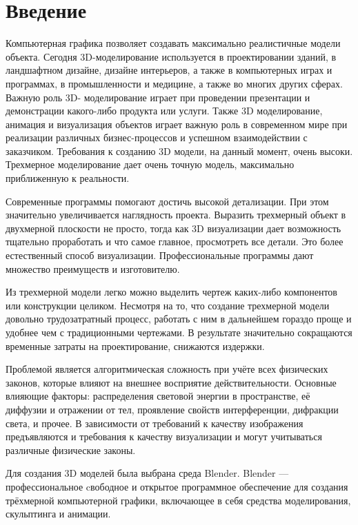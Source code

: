 \documentclass[areasetadvanced]{scrartcl}
\begin{document}
\section*{Введение}
    Компьютерная графика позволяет создавать максимально реалистичные модели
    объекта. Сегодня 3D-моделирование используется в проектировании зданий, в ландшафтном
    дизайне, дизайне интерьеров, а также в компьютерных играх и программах, в
    промышленности и медицине, а также во многих других сферах. Важную роль 3D-
    моделирование играет при проведении презентации и демонстрации какого-либо продукта
    или услуги. Также 3D моделирование, анимация и визуализация объектов играет важную
    роль в современном мире при реализации различных бизнес-процессов и успешном
    взаимодействии с заказчиком. Требования к созданию 3D модели, на данный момент, очень
    высоки. Трехмерное моделирование дает очень точную модель, максимально приближенную
    к реальности. 

    Современные программы помогают достичь высокой детализации. При этом
    значительно увеличивается наглядность проекта. Выразить трехмерный объект в двухмерной
    плоскости не просто, тогда как 3D визуализации дает возможность тщательно проработать и
    что самое главное, просмотреть все детали. Это более естественный способ визуализации.
    Профессиональные программы дают множество преимуществ и изготовителю. 

    Из трехмерной модели легко можно выделить чертеж каких-либо компонентов или конструкции
    целиком. Несмотря на то, что создание трехмерной модели довольно трудозатратный
    процесс, работать с ним в дальнейшем гораздо проще и удобнее чем с традиционными
    чертежами. В результате значительно сокращаются временные затраты на проектирование,
    снижаются издержки.

        Проблемой является алгоритмическая сложность при учёте всех физических законов,
    которые влияют на внешнее восприятие действительности. Основные влияющие факторы:
    распределения световой энергии в пространстве, её диффузии и отражении от тел,
    проявление свойств интерференции, дифракции света, и прочее. В зависимости от
    требований к качеству изображения предъявляются и требования к качеству визуализации и
    могут учитываться различные физические законы. 
    
        Для создания 3D моделей была выбрана среда Blender. Blender — профессиональное
    cвободное и открытое программное обеспечение для создания трёхмерной компьютерной
    графики, включающее в себя средства моделирования, скульптинга и анимации.
\newpage
\end{document}
